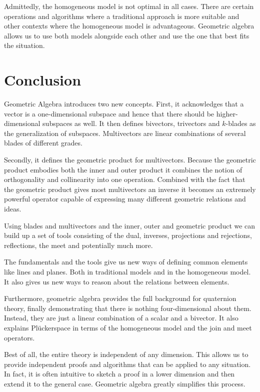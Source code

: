 \documentclass[10pt]{report}
\begin{document}
Admittedly, the homogeneous model is not optimal in all cases.
There are certain operations and algorithms where a traditional
approach is more suitable and other contexts where the homogeneous
model is advantageous. Geometric algebra allows us to use both
models alongside each other and use the one that best fits the
situation.

\chapter{Conclusion}

Geometric Algebra introduces two new concepts. First, it
acknowledges that a vector is a one-dimensional subspace and hence
that there should be higher-dimensional subspaces as well. It then
defines bivectors, trivectors and $k$-blades as the generalization
of subspaces. Multivectors are linear combinations of several
blades of different grades.

Secondly, it defines the geometric product for multivectors.
Because the geometric product embodies both the inner and outer
product it combines the notion of orthogonality and collinearity
into one operation. Combined with the fact that the geometric
product gives most multivectors an inverse it becomes an extremely
powerful operator capable of expressing many different geometric
relations and ideas.

Using blades and multivectors and the inner, outer and geometric
product we can build up a set of tools consisting of the dual,
inverses, projections and rejections, reflections, the meet and
potentially much more.

The fundamentals and the tools give us new ways of defining common
elements like lines and planes. Both in traditional models and in
the homogeneous model. It also gives us new ways to reason about
the relations between elements.

Furthermore, geometric algebra provides the full background for
quaternion theory, finally demonstrating that there is nothing
four-dimensional about them. Instead, they are just a linear
combination of a scalar and a bivector. It also explains
Pl\"uckerspace in terms of the homogeneous model and the join and
meet operators.

Best of all, the entire theory is independent of any dimension.
This allows us to provide independent proofs and algorithms that
can be applied to any situation. In fact, it is often intuitive to
sketch a proof in a lower dimension and then extend it to the
general case. Geometric algebra greatly simplifies this process.
\end{document}
